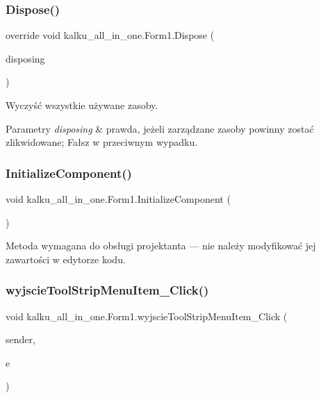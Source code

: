 \subsubsection{\texorpdfstring{Dispose()}{Dispose()}}
{\footnotesize\ttfamily override void kalku\+\_\+all\+\_\+in\+\_\+one.\+Form1.\+Dispose (\begin{DoxyParamCaption}\item[{bool}]{disposing }\end{DoxyParamCaption})\hspace{0.3cm}{\ttfamily [protected]}}



Wyczyść wszystkie używane zasoby. 


\begin{DoxyParams}{Parametry}
{\em disposing} & prawda, jeżeli zarządzane zasoby powinny zostać zlikwidowane; Fałsz w przeciwnym wypadku.\\
\hline
\end{DoxyParams}
\mbox{\label{classkalku__all__in__one_1_1_form1_acfb7737bb18b9292d406dc92c735c492}} 
\subsubsection{\texorpdfstring{InitializeComponent()}{InitializeComponent()}}
{\footnotesize\ttfamily void kalku\+\_\+all\+\_\+in\+\_\+one.\+Form1.\+Initialize\+Component (\begin{DoxyParamCaption}{ }\end{DoxyParamCaption})\hspace{0.3cm}{\ttfamily [private]}}



Metoda wymagana do obsługi projektanta — nie należy modyfikować jej zawartości w edytorze kodu. 

\mbox{\label{classkalku__all__in__one_1_1_form1_a86268b4e30d5a242cbe53da566b7feb4}} 
\subsubsection{\texorpdfstring{wyjscieToolStripMenuItem\_Click()}{wyjscieToolStripMenuItem\_Click()}}
{\footnotesize\ttfamily void kalku\+\_\+all\+\_\+in\+\_\+one.\+Form1.\+wyjscie\+Tool\+Strip\+Menu\+Item\+\_\+\+Click (\begin{DoxyParamCaption}\item[{object}]{sender,  }\item[{Event\+Args}]{e }\end{DoxyParamCaption})\hspace{0.3cm}{\ttfamily [private]}}



